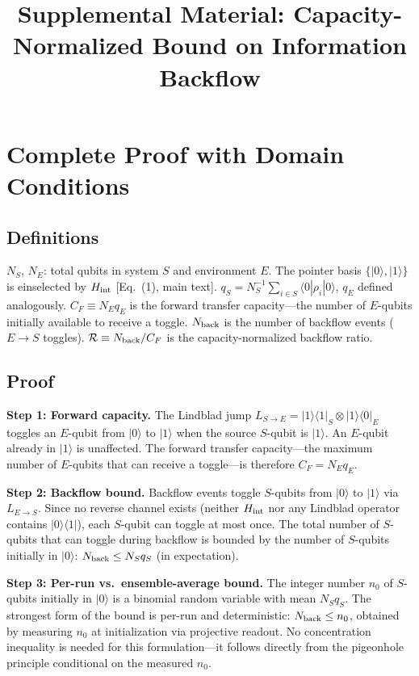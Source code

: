 \documentclass[aps,pra,onecolumn]{revtex4-2}
\begin{document}
\title{Supplemental Material: Capacity-Normalized Bound on Information Backflow}

\maketitle

\section{Complete Proof with Domain Conditions}

\subsection{Definitions}

$N_S$, $N_E$: total qubits in system $S$ and environment $E$. The pointer basis $\{|0\rangle,|1\rangle\}$ is einselected by $H_{\rm int}$ [Eq.~(1), main text]. $q_S = N_S^{-1}\sum_{i\in S}\langle 0|\rho_i|0\rangle$, $q_E$ defined analogously. $C_F \equiv N_E q_E$ is the forward transfer capacity---the number of $E$-qubits initially available to receive a toggle. $N_{\rm back}$ is the number of backflow events ($E \to S$ toggles). $\mathcal{R} \equiv N_{\rm back}/C_F$ is the capacity-normalized backflow ratio.

\subsection{Proof}

\textbf{Step 1: Forward capacity.} The Lindblad jump $L_{S\to E}=|1\rangle\langle 1|_S\otimes|1\rangle\langle 0|_E$ toggles an $E$-qubit from $|0\rangle$ to $|1\rangle$ when the source $S$-qubit is $|1\rangle$. An $E$-qubit already in $|1\rangle$ is unaffected. The forward transfer capacity---the maximum number of $E$-qubits that can receive a toggle---is therefore $C_F = N_E q_E$.

\textbf{Step 2: Backflow bound.} Backflow events toggle $S$-qubits from $|0\rangle$ to $|1\rangle$ via $L_{E\to S}$. Since no reverse channel exists (neither $H_{\rm int}$ nor any Lindblad operator contains $|0\rangle\langle 1|$), each $S$-qubit can toggle at most once. The total number of $S$-qubits that can toggle during backflow is bounded by the number of $S$-qubits initially in $|0\rangle$: $N_{\rm back} \leq N_S q_S$ (in expectation).

\textbf{Step 3: Per-run vs.\ ensemble-average bound.} The integer number $n_0$ of $S$-qubits initially in $|0\rangle$ is a binomial random variable with mean $N_S q_S$. The strongest form of the bound is per-run and deterministic: $N_{\rm back} \leq n_0$, obtained by measuring $n_0$ at initialization via projective readout. No concentration inequality is needed for this formulation---it follows directly from the pigeonhole principle conditional on the measured $n_0$.
\end{document}
